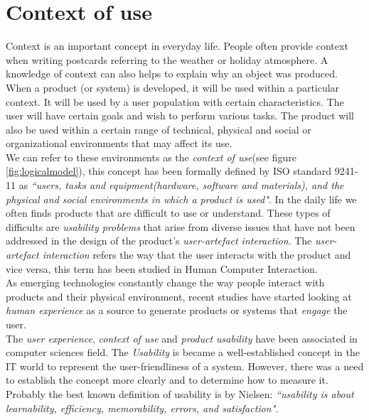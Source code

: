 \section{Context of use}\label{contextofuse}

Context is an important concept in everyday life. People often provide
context when writing postcards referring to the weather or holiday
atmosphere. A knowledge of context can also helps to explain why an
object was produced.\\  When a product (or system) is developed, it
will be used within a particular context. It will be used by a user
population with certain characteristics. The user will have certain
goals and wish to perform various tasks. The product will also be used
within a certain range of technical, physical and social or
organizational environments\cite{maguire2001context} that may affect
its use.\\   
We can refer to these environments as the \textit{context of use}(see
figure \ref{fig:logicalmodel}), this concept has been formally defined
by ISO standard 9241-11\cite{international1998iso} as \textit{``users,
tasks and equipment(hardware, software and materials), and the
physical and social environments in which a product is used"}. 
In the daily life we often finds products that are difficult to use or
understand. These types of difficults are \textit{usability problems}
that arise from  diverse issues that have not been addressed in the
design of the product's \textit{user-artefact interaction}. The
\textit{user-artefact interaction} refers the way that the user
interacts with the product and vice versa, this term has been studied
in Human Computer Interaction. \\As emerging technologies constantly
change the way people interact with products and their physical
environment, recent studies have started looking at \textit{human
experience} as a source to generate products or systems that
\textit{engage} the user.\\
The \textit{user experience}, \textit{context of use} and
\textit{product usability} have been associated in computer sciences
field. The \textit{Usability} is became a well-established concept in
the IT world to represent the user-friendliness of a system. However,
there was a need to establish the concept more clearly and to
determine how to measure it. Probably the best known definition of
usability is by Nielsen\cite{nielsen1994usability}: 
\textit{``usability is about learnability, efficiency, 
memorability, errors, and satisfaction".}
